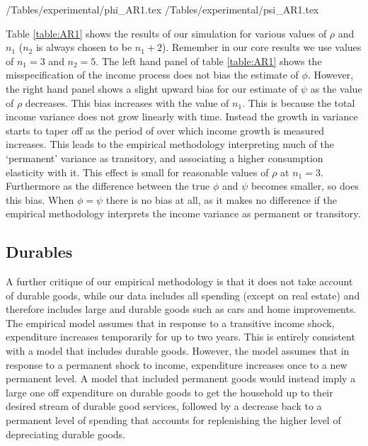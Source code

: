 \begin{center}
	\econtexRoot/Tables/experimental/phi_AR1.tex	
	\econtexRoot/Tables/experimental/psi_AR1.tex		
	\label{table:AR1}
\end{center}

Table \ref{table:AR1} shows the results of our simulation for various values of $\rho$ and $n_1$ ($n_2$ is always chosen to be $n_1+2$). Remember in our core results we use values of $n_1=3$ and $n_2=5$. The left hand panel of table \ref{table:AR1} shows the misspecification of the income process does not bias the estimate of $\phi$. However, the right hand panel shows a slight upward bias for our estimate of $\psi$ as the value of $\rho$ decreases. This bias increases with the value of $n_1$. This is because the total income variance does not grow linearly with time. Instead the growth in variance starts to taper off as the period of over which income growth is measured increases. This leads to the empirical methodology interpreting much of the `permanent' variance as transitory, and associating a higher consumption elasticity with it. This effect is small for reasonable values of $\rho$ at $n_1=3$. Furthermore as the difference between the true $\phi$ and $\psi$ becomes smaller, so does this bias. When $\phi=\psi$ there is no bias at all, as it makes no difference if the empirical methodology interprets the income variance as permanent or transitory.

\subsection{Durables} \label{durables}
A further critique of our empirical methodology is that it does not take account of durable goods, while our data includes all spending (except on real estate) and therefore includes large and durable goods such as cars and home improvements. The empirical model assumes that in response to a transitive income shock, expenditure increases temporarily for up to two years. This is entirely consistent with a model that includes durable goods. However, the model assumes that in response to a permanent shock to income, expenditure increases once to a new permanent level. A model that included permanent goods would instead imply a large one off expenditure on durable goods to get the household up to their desired stream of durable good services, followed by a decrease back to a permanent level of spending that accounts for replenishing the higher level of depreciating durable goods.

